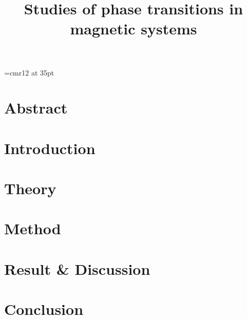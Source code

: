 
\font\myfont=cmr12 at 35pt
\title{\textbf{{\myfont Studies of phase transitions in magnetic systems}}}

\mnfrontpage


\pagestyle{fancy}
\fancyhf{}
\fancyfoot[CE,LO]{\leftmark}

\renewcommand{\headrulewidth}{2pt}
\renewcommand{\footrulewidth}{1pt}

\tableofcontents



\pagebreak
\section*{Abstract}%




\pagebreak
\section{Introduction}



\pagebreak
\section{Theory}\label{sec:theory}



\pagebreak
\section{Method}



\pagebreak
\section{Result \& Discussion}




%

\pagebreak
\section{Conclusion}




